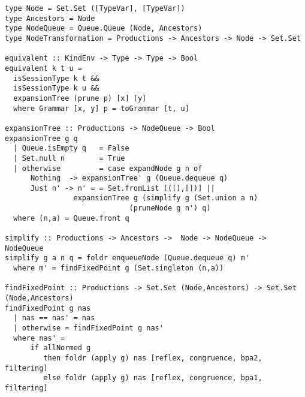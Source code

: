\begin{lstlisting}[caption={Algorithm to check the equivalence of context-free session types. Haskell code.},label={lst:algorithm},captionpos=b]
type Node = Set.Set ([TypeVar], [TypeVar])
type Ancestors = Node
type NodeQueue = Queue.Queue (Node, Ancestors)
type NodeTransformation = Productions -> Ancestors -> Node -> Set.Set 

equivalent :: KindEnv -> Type -> Type -> Bool
equivalent k t u =
  isSessionType k t &&
  isSessionType k u &&
  expansionTree (prune p) [x] [y]
  where Grammar [x, y] p = toGrammar [t, u]

expansionTree :: Productions -> NodeQueue -> Bool
expansionTree g q
  | Queue.isEmpty q   = False
  | Set.null n        = True
  | otherwise         = case expandNode g n of
      Nothing  -> expansionTree' g (Queue.dequeue q)
      Just n' -> n' = = Set.fromList [([],[])] ||
                expansionTree g (simplify g (Set.union a n) 
                             (pruneNode g n') q)
  where (n,a) = Queue.front q

simplify :: Productions -> Ancestors ->  Node -> NodeQueue -> NodeQueue
simplify g a n q = foldr enqueueNode (Queue.dequeue q) m'
  where m' = findFixedPoint g (Set.singleton (n,a))

findFixedPoint :: Productions -> Set.Set (Node,Ancestors) -> Set.Set (Node,Ancestors)
findFixedPoint g nas
  | nas == nas' = nas
  | otherwise = findFixedPoint g nas'
  where nas' = 
      if allNormed g 
         then foldr (apply g) nas [reflex, congruence, bpa2, filtering]
         else foldr (apply g) nas [reflex, congruence, bpa1, filtering]
\end{lstlisting}


